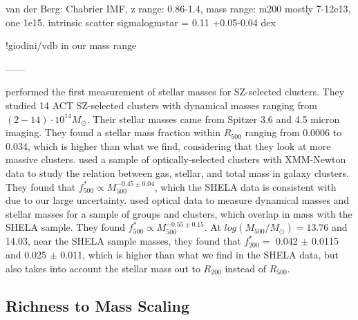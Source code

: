 \documentclass[a4paper,fleqn,usenatbib]{mnras}
\begin{document}
van der Berg: Chabrier IMF, z range: 0.86-1.4, mass range: m200  mostly 7-12e13, one 1e15. intrinsic scatter sigmalogmstar = 0.11 +0.05-0.04 dex

!giodini/vdb in our mass range

------

\cite{2013MNRAS.435.3469H} performed the first measurement of stellar masses for SZ-selected clusters. They studied 14 ACT SZ-selected clusters with dynamical masses ranging from $(2-14) \cdot 10^{14} M_{\odot}$. Their stellar masses came from Spitzer 3.6 and 4.5 micron imaging. They found a stellar mass fraction within $R_{500}$ ranging from 0.0006 to 0.034, which is higher than what we find, considering that they look at more massive clusters.
\cite{2013ApJ...778...14G} used a sample of optically-selected clusters with XMM-Newton data to study the relation between gas, stellar, and total mass in galaxy clusters. They found that $f^*_{500} \propto M_{500}^{-0.45 \pm 0.04}$, which the SHELA data is consistent with due to our large uncertainty.  
\cite{2010MNRAS.407..263A} used optical data to measure dynamical masses and stellar masses for a sample of groups and clusters, which overlap in mass with the SHELA sample. They found $f^*_{500} \propto M_{500}^{-0.55 \pm 0.15}$. At $log(M_{500}/M_{\odot}) = 13.76$ and 14.03, near the SHELA sample masses, they found that $f^*_{200} =$ 0.042 $\pm$ 0.0115 and 0.025 $\pm$ 0.011, which is higher than what we find in the SHELA data, but also takes into account the stellar mass out to $R_{200}$ instead of $R_{500}$. 
\fi

\subsection{Richness to Mass Scaling}
\end{document}
